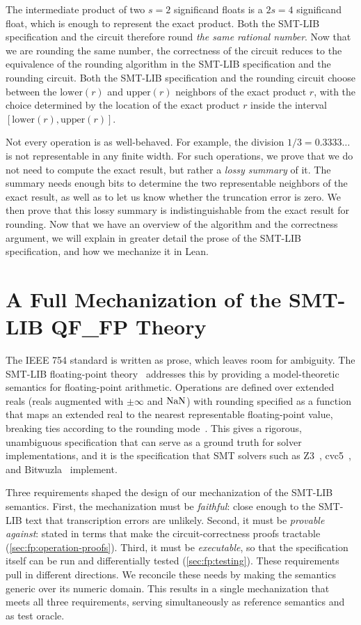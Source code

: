 The intermediate product of two $s = 2$ significand floats is a $2s = 4$ significand float, which is enough to represent the exact product.
Both the SMT-LIB specification and the circuit therefore round \emph{the same rational number}.
Now that we are rounding the same number, the correctness of the circuit
reduces to the equivalence of the rounding algorithm in the SMT-LIB specification and the rounding circuit.
Both the SMT-LIB specification and the rounding circuit choose between the $\mathrm{lower}(r)$ and $\mathrm{upper}(r)$ neighbors of the exact product $r$,
with the choice determined by the location of the exact product $r$ inside the interval $[\mathrm{lower}(r), \mathrm{upper}(r)]$.


Not every operation is as well-behaved.
For example, the division $1/3 = 0.3333\ldots$ is not representable in any finite width.
For such operations, we prove that we do not need to compute the exact result,
but rather a \emph{lossy summary} of it.
The summary needs enough bits to determine the two representable neighbors of the exact result,
as well as to let us know whether the truncation error is zero.
We then prove that this lossy summary is indistinguishable
from the exact result for rounding.
Now that we have an overview of the algorithm and the correctness argument,
we will explain in greater detail the prose of the SMT-LIB specification,
and how we mechanize it in Lean.

\section{A Full Mechanization of the SMT-LIB QF\_FP Theory}
\label{sec:fp:spec}

The IEEE 754 standard is written as prose, which leaves room for ambiguity.
The SMT-LIB floating-point theory~\cite{extrealsemantics}
addresses this by providing a model-theoretic semantics for floating-point arithmetic.
Operations are defined over extended reals (reals augmented with $\pm\infty$ and $\mathrm{NaN}$)
with rounding specified as a function that maps an extended real
to the nearest representable floating-point value,
breaking ties according to the rounding mode~\cite{extrealsemantics}.
This gives a rigorous, unambiguous specification
that can serve as a ground truth for solver implementations,
and it is the specification that SMT solvers such as Z3~\cite{de2008z3},
cvc5~\cite{barbosa2022cvc5}, and Bitwuzla~\cite{niemetz2023bitwuzla} implement.

Three requirements shaped the design of our mechanization of the SMT-LIB semantics.
First, the mechanization must be \emph{faithful}: close enough to the SMT-LIB
text that transcription errors are unlikely.
Second, it must be \emph{provable against}: stated in terms that make the
circuit-correctness proofs tractable (\cref{sec:fp:operation-proofs}).
Third, it must be \emph{executable}, so that the specification itself can be run and differentially tested (\cref{sec:fp:testing}).
These requirements pull in different directions.
We reconcile these needs by making the semantics generic over its numeric domain.
This results in a single mechanization that meets all three requirements,
serving simultaneously as reference semantics and as test oracle.


